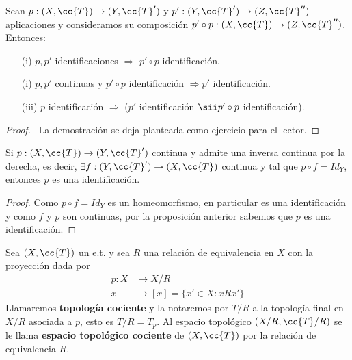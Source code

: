 \begin{prop}
    Sean $p:(X, \cc{T}) \to (Y, \cc{T}')$ y $p':(Y, \cc{T}') \to (Z, \cc{T}'')$ aplicaciones y consideramos su composición $p'\circ p:(X, \cc{T})\to (Z, \cc{T}'')$. Entonces:
    \begin{enumerate}
        \item[(i)] $p,p'$ identificaciones $\Rightarrow$ $p'\circ p$ identificación.
        \item[(i)] $p,p'$ continuas y $p'\circ p$ identificación $\Rightarrow p'$ identificación.
        \item[(iii)] $p$ identificación $\Rightarrow$ ($p'$ identificación $ \sii p'\circ p$ identificación). 
    \end{enumerate}
    \begin{proof}\ 
        La demostración se deja planteada como ejercicio para el lector.

    \end{proof}
\end{prop}

\begin{coro}
    Si $p:(X, \cc{T})\to (Y, \cc{T}')$ continua y admite una inversa continua por la derecha, es decir, $\exists f:(Y, \cc{T}')\to (X, \cc{T})$ continua y tal que $p\circ f=Id_Y$, entonces $p$ es una identificación.
    \begin{proof}
        Como $p\circ f=Id_Y$ es un homeomorfismo, en particular es una identificación y como $f$ y $p$ son continuas, por la proposición anterior sabemos que $p$ es una identificación. 

    \end{proof}
\end{coro}

\begin{definicion}
    Sea $(X, \cc{T})$ un e.t. y sea $R$ una relación de equivalencia en $X$ con la proyección dada por
    \begin{align*}
        p:X&\to X/R\\
        x &\mapsto [x] = \{x'\in X : xRx'\}
    \end{align*}
    Llamaremos \textbf{topología cociente} y la notaremos por $T/R$ a la topología final en $X/R$ asociada a $p$, esto es $T/R=T_p$. Al espacio topológico $(X/R, \cc{T}/R)$ se le llama \textbf{espacio topológico cociente} de $(X, \cc{T})$ por la relación de equivalencia $R$.
    \endsquare
\end{definicion}

